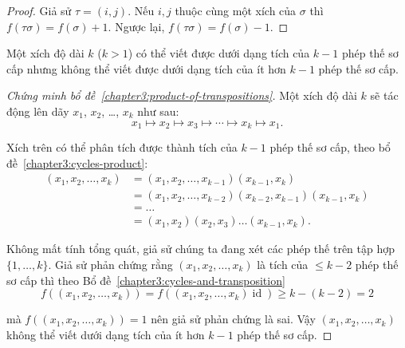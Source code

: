 \begin{proof}
    Giả sử $\tau = (i, j)$. Nếu $i, j$ thuộc cùng một xích của $\sigma$ thì $f(\tau\sigma) = f(\sigma) + 1$. Ngược lại, $f(\tau\sigma) = f(\sigma) - 1$.
\end{proof}

\begin{lemma}\label{chapter3:product-of-transpositions}
    Một xích độ dài $k$ ($k > 1$) có thể viết được dưới dạng tích của $k-1$ phép thế sơ cấp nhưng không thể viết được dưới dạng tích của ít hơn $k-1$ phép thế sơ cấp.
\end{lemma}

\begin{proof}[Chứng minh bổ đề~\ref{chapter3:product-of-transpositions}]
    Một xích độ dài $k$ sẽ tác động lên dãy $x_{1}$, $x_{2}$, \ldots, $x_{k}$ như sau:
    \[
        x_{1}\mapsto x_{2} \mapsto x_{3} \mapsto \cdots \mapsto x_{k} \mapsto x_{1}.
    \]
    
    Xích trên có thể phân tích được thành tích của $k - 1$ phép thế sơ cấp, theo bổ đề~\ref{chapter3:cycles-product}:
    \begin{align*}
        (x_{1}, x_{2}, \ldots, x_{k}) & = (x_{1}, x_{2}, \ldots, x_{k-1})(x_{k-1}, x_{k})                   \\
                                      & = (x_{1}, x_{2}, \ldots, x_{k-2})(x_{k-2}, x_{k-1})(x_{k-1}, x_{k}) \\
                                      & = \ldots                                                            \\
                                      & = (x_{1}, x_{2})(x_{2}, x_{3})\ldots (x_{k-1}, x_{k}).
    \end{align*}

    Không mất tính tổng quát, giả sử chúng ta đang xét các phép thế trên tập hợp $\{ 1, \ldots, k \}$. Giả sử phản chứng rằng $(x_{1}, x_{2}, \ldots, x_{k})$ là tích của $\leq k - 2$ phép thế sơ cấp thì theo Bổ đề~\ref{chapter3:cycles-and-transposition}
    \[
        f((x_{1}, x_{2}, \ldots, x_{k})) = f((x_{1}, x_{2}, \ldots, x_{k})\operatorname{id}) \geq k - (k - 2) = 2
    \]

    mà $f((x_{1}, x_{2}, \ldots, x_{k})) = 1$ nên giả sử phản chứng là sai. Vậy $(x_{1}, x_{2}, \ldots, x_{k})$ không thể viết dưới dạng tích của ít hơn $k-1$ phép thế sơ cấp.
\end{proof}

